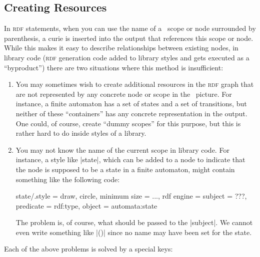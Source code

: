 \subsection{Creating Resources}

In \textsc{rdf} statements, when you can use the name of a \tikzname\
scope or node surrounded by parenthesis, a curie is inserted into the
output that references this scope or node. While this makes it easy to
describe relationships between existing nodes, in library code
(\textsc{rdf} generation code added to library styles and gets executed
as a ``byproduct'') there are two situations where this method is
insufficient: 
\begin{enumerate}
\item You may sometimes wish to create additional resources in the
  \textsc{rdf} graph that are not represented by any concrete node or
  scope in the \tikzname\ picture. For instance, a finite automaton
  has a set of states and a set of transitions, but neither of these
  ``containers'' has any concrete representation in the output. One
  could, of course, create ``dummy scopes'' for this purpose, but this
  is rather hard to do inside styles of a library.
\item You may not know the name of the current scope in library
  code. For instance, a style like |state|, which can be added to a
  node to indicate that the node is supposed to be a state in a finite
  automaton, might contain something like the following code:
\begin{codeexample}
state/.style = {
  draw, circle, minimum size = ...,
  rdf engine = {
    subject   = ???,
    predicate = rdf:type,
    object    = automata:state
  }
}
\end{codeexample}
  The problem is, of course, what should be passed to the
  |subject|. We cannot even write something like |(\tikz@fig@name)|
  since no name may have been set for the state.
\end{enumerate}

Each of the above problems is solved by a special keys:

